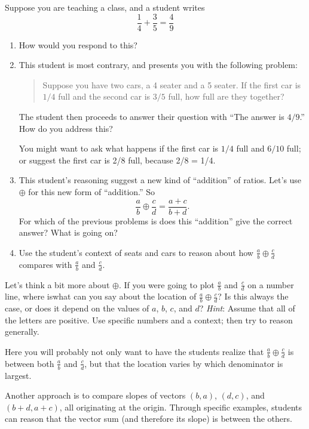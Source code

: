 \begin{prob}
Suppose you are teaching a class, and a student writes
\[
\frac{1}{4} + \frac{3}{5} = \frac{4}{9}
\]
\begin{enumerate}
\item How would you respond to this? 
\item This student is most contrary, and presents you with the following problem:
\begin{quote}
Suppose you have two cars, a 4 seater and a 5 seater. If the first car
is $1/4$ full and the second car is $3/5$ full, how full are they
together?
\end{quote}
The student then proceeds to answer their question with ``The answer
is $4/9$.'' How do you address this?

\begin{teachingnote}
You might want to ask what happens if the first car is $1/4$ full and $6/10$ full;  or suggest the first car is 2/8 full, because 2/8 = 1/4.
\end{teachingnote}

\item This student's reasoning suggest a new kind of ``addition'' of ratios.  Let's use $\oplus$ for this new form of ``addition.'' So
\[
\frac{a}{b} \oplus \frac{c}{d} = \frac{a+c}{b+d}.
\]
For which of the previous problems is does this ``addition'' give the correct answer?  What is going on?  
\item Use the student's context of seats and cars to reason about how $\frac{a}{b} \oplus \frac{c}{d}$ compares with $\frac{a}{b}$ and $\frac{c}{d}.$
\end{enumerate}
\end{prob}

\begin{prob} 
Let's think a bit more about $\oplus$. If you were going to plot
$\frac{a}{b}$ and $\frac{c}{d}$ on a number line, where iswhat can you 
say about the location of 
$\frac{a}{b} \oplus \frac{c}{d}$? Is this always the case, or does it
depend on the values of $a$, $b$, $c$, and $d$?  
\emph{Hint}:  Assume that all of the letters are positive.  Use specific numbers and a 
context; then try to reason generally.
\end{prob}

\begin{teachingnote}
Here you will probably not only want to have the students realize that
$\frac{a}{b} \oplus \frac{c}{d}$ is between both $\frac{a}{b}$ and
$\frac{c}{d}$, but that the location varies by which denominator is
largest.

Another approach is to compare slopes of vectors $(b,a)$, $(d,c)$, and $(b+d,a+c)$, all originating at the origin.  Through specific examples, students can reason that the vector sum (and therefore its slope) is between the others.  
\end{teachingnote}

